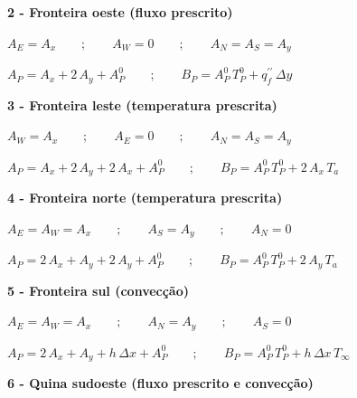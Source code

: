 \vspace{0.5cm}
\noindent\textbf{2 - Fronteira oeste (fluxo prescrito)}

\begin{center}
    $A_{E} = A_{x} \qquad ; \qquad A_{W} = 0 \qquad ; \qquad A_{N} = A_{S} = A_{y}$
\end{center}
\begin{center}
    $A_{P} = A_{x} + 2\,A_{y} + A_{P}^{0} \qquad ; \qquad B_{P} = A_{P}^{0}\,T_{P}^{0} + q^{\prime\prime}_{f}\,\Delta y$
\end{center}

\vspace{0.5cm}
\noindent\textbf{3 - Fronteira leste (temperatura prescrita)}

\begin{center}
    $A_{W} = A_{x} \qquad ; \qquad A_{E} = 0 \qquad ; \qquad A_{N} = A_{S} = A_{y}$
\end{center}
\begin{center}
    $A_{P} = A_{x} + 2\,A_{y} + 2\,A_{x} + A_{P}^{0} \qquad ; \qquad B_{P} = A_{P}^{0}\,T_{P}^{0} + 2\,A_{x}\,T_{a}$
\end{center}

\vspace{0.5cm}
\noindent\textbf{4 - Fronteira norte (temperatura prescrita)}

\begin{center}
    $A_{E} = A_{W} = A_{x} \qquad ; \qquad A_{S} = A_{y} \qquad ; \qquad A_{N} = 0$
\end{center}
\begin{center}
    $A_{P} = 2\,A_{x} + A_{y} + 2\,A_{y} + A_{P}^{0} \qquad ; \qquad B_{P} = A_{P}^{0}\,T_{P}^{0} + 2\,A_{y}\,T_{a}$
\end{center}

\vspace{0.5cm}
\noindent\textbf{5 - Fronteira sul (convecção)}

\begin{center}
    $A_{E} = A_{W} = A_{x} \qquad ; \qquad A_{N} = A_{y} \qquad ; \qquad A_{S} = 0$
\end{center}
\begin{center}
    $A_{P} = 2\,A_{x} + A_{y} + h\,\Delta x + A_{P}^{0} \qquad ; \qquad B_{P} = A_{P}^{0}\,T_{P}^{0} + h\,\Delta x\,T_{\infty}$
\end{center}

\vspace{0.5cm}
\noindent\textbf{6 - Quina sudoeste (fluxo prescrito e convecção)}

